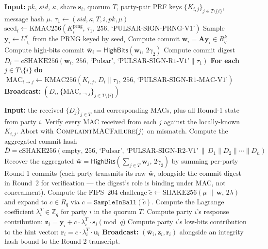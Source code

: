 \documentclass[11pt,a4paper]{article}
\theoremstyle{definition}
\theoremstyle{remark}
\newcommand{\Rq}{R_q}
\newcommand{\Zq}{\mathbb{Z}_q}
\newcommand{\SHAKE}{\mathrm{SHAKE256}}
\newcommand{\cSHAKE}{\mathrm{cSHAKE256}}
\newcommand{\KMAC}{\mathrm{KMAC256}}
\newcommand{\HighBits}{\mathsf{HighBits}}
\newcommand{\Sign}{\textsc{Sign}}
\begin{document}
\begin{algorithm}[H]
\caption{$\Sign$ Round~1 (party $i$, attempt $\kappa$)}
\label{alg:sign-r1}
\begin{algorithmic}[1]
\State \textbf{Input:} $\mathit{pk}$, $\mathit{sid}$, $\kappa$, share $\mathbf{s}_i$,
quorum $T$, party-pair PRF keys $\{K_{i,j}\}_{j \in T \setminus \{i\}}$,
message hash $\mu$.
\State $\tau_1 \gets (\mathit{sid}, \kappa, T, i, \mathit{pk}, \mu)$
\State $\text{seed}_i \gets \KMAC(K_i^{\mathrm{prng}},\,\tau_1,\,256,\,\text{`PULSAR-SIGN-PRNG-V1'})$
\State Sample $\mathbf{y}_i \gets U_{\gamma_1}^\ell$ from the PRNG keyed by $\text{seed}_i$
\State Compute commit $\mathbf{w}_i = \mathbf{A} \mathbf{y}_i \in \Rq^k$
\State Compute high-bits commit $\bar{\mathbf{w}}_i = \HighBits(\mathbf{w}_i,\,2\gamma_2)$
\State Compute commit digest $D_i = \cSHAKE(\bar{\mathbf{w}}_i,\,256,\,\text{`Pulsar'},\,\text{`PULSAR-SIGN-R1-V1'} \| \tau_1)$
\State \textbf{For each} $j \in T \setminus \{i\}$ \textbf{do}
$\;\mathrm{MAC}_{i \to j} \gets \KMAC(K_{i,j},\,D_i \| \tau_1,\,256,\,\text{`PULSAR-SIGN-R1-MAC-V1'})$
\State \textbf{Broadcast:} $(D_i, \{\mathrm{MAC}_{i \to j}\}_{j \in T \setminus \{i\}})$
\end{algorithmic}
\end{algorithm}

\begin{algorithm}[H]
\caption{$\Sign$ Round~2 (party $i$, attempt $\kappa$)}
\label{alg:sign-r2}
\begin{algorithmic}[1]
\State \textbf{Input:} the received $\{D_j\}_{j \in T}$ and corresponding MACs, plus all Round-1 state from party $i$.
\State Verify every MAC received from each $j$ against the locally-known $K_{i,j}$. Abort with $\textsc{ComplaintMACFailure}(j)$ on mismatch.
\State Compute the aggregated commit hash $\bar D = \cSHAKE(\text{empty},\,256,\,\text{`Pulsar'},\,\text{`PULSAR-SIGN-R2-V1'} \,\|\, D_1 \| D_2 \| \cdots \| D_n)$
\State Recover the aggregated $\bar{\mathbf{w}} = \HighBits(\sum_{j \in T} \mathbf{w}_j,\,2\gamma_2)$ by summing per-party Round-1 commits (each party transmits its raw $\bar{\mathbf{w}}_i$ alongside the commit digest in Round~2 for verification --- the digest's role is binding under MAC, not concealment).
\State Compute the FIPS~204 challenge $\tilde c \gets \SHAKE(\mu \,\|\, \bar{\mathbf{w}},\,2\lambda)$ and expand to $c \in \Rq$ via $c = \texttt{SampleInBall}(\tilde c)$.
\State Compute the Lagrange coefficient $\lambda_i^T \in \Zq$ for party $i$ in the quorum $T$.
\State Compute party $i$'s response contribution:
$\mathbf{z}_i = \mathbf{y}_i + c \cdot \lambda_i^T \cdot \mathbf{s}_i \pmod q$
\State Compute party $i$'s low-bits contribution to the hint vector:
$\mathbf{r}_i = c \cdot \lambda_i^T \cdot \mathbf{u}_i$ 
\State \textbf{Broadcast:} $(\bar{\mathbf{w}}_i, \mathbf{z}_i, \mathbf{r}_i)$ alongside an integrity hash bound to the Round-2 transcript.
\end{algorithmic}
\end{algorithm}
\end{document}
